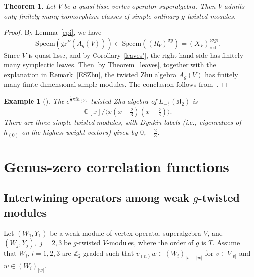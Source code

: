 \documentclass[9pt]{amsart}
\newtheorem{theorem}{Theorem}[section]
\newtheorem{example}{Example}[section]
\begin{document}
\begin{theorem}\label{finitelymanyordinary}
Let $V$ be a quasi-lisse vertex operator superalgebra. Then $V$ admits only finitely many isomorphism classes of simple ordinary $g$-twisted modules.
\end{theorem}

\begin{proof}
By Lemma~\ref{epi}, we have
\[
\mathrm{Specm}(\mathrm{gr}^{\overline{F}}(A_g(V))) \subset \mathrm{Specm}((R_V)^{\sigma g}) = (X_V)_{\mathrm{red}}^{\langle \sigma g \rangle}.
\]
Since $V$ is quasi-lisse, and by Corollary \ref{leaves'}, the right-hand side has finitely many symplectic leaves. Then, by Theorem~\ref{leaves}, together with the explanation in Remark~\ref{ESZhu}, the twisted Zhu algebra \( A_g(V) \) has finitely many finite-dimensional simple modules. The conclusion follows from~\cite[Theorem 7.2]{dong1995twisted}.
\end{proof}

\begin{example}[\cite{LLY2023spectral}]\label{twistedzhualgebra}
The $e^{\frac{1}{2} \pi i h_{(0)}}$-twisted Zhu algebra of $L_{-\frac{4}{3}}(\mathfrak{sl}_2)$ is
\[
\mathbb{C}[x] / \langle x(x - \tfrac{2}{3})(x + \tfrac{2}{3}) \rangle.
\]
There are three simple twisted modules, with Dynkin labels (i.e., eigenvalues of $h_{(0)}$ on the highest weight vectors) given by $0$, $\pm \frac{2}{3}$.
\end{example}



\section{Genus-zero correlation functions}

\subsection{Intertwining operators among weak \texorpdfstring{$g$}{Lg}-twisted modules}
Let  $(W_{1},Y_{1})$ be a weak module of vertex operator superalgebra $V$, and $(W_{j},Y_{j}),$ $j=2,3$ be $g$-twisted $V$-modules, where the order of $g$ is $T$.  Assume that $W_i$, $i=1,2,3$ are $\mathbb{Z}_{2}$-graded such that $v_{(n)}w\in (W_i)_{|v|+|w|}$ for $v\in V_{|v|}$ and $w\in (W_i)_{|w|}$.
\end{document}
